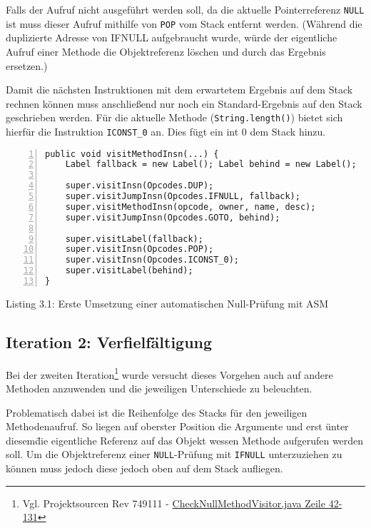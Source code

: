 Falls der Aufruf nicht ausgeführt werden soll, da die aktuelle Pointerreferenz \texttt{NULL}
ist muss dieser Aufruf mithilfe von \texttt{POP} vom Stack entfernt werden.
(Während die duplizierte Adresse von IFNULL aufgebraucht wurde, würde der
eigentliche Aufruf einer Methode die Objektreferenz löschen und durch das Ergebnis
ersetzen.)

Damit die nächsten Instruktionen mit dem erwartetem Ergebnis auf dem Stack
rechnen können muss anschließend nur noch ein Standard-Ergebnis
auf den Stack geschrieben werden. Für die aktuelle Methode (\texttt{String.length()})
bietet sich hierfür die Instruktion \texttt{ICONST\_0} an. Dies fügt ein int 0 dem Stack hinzu.

\begin{lstlisting}[basicstyle=\ttfamily,numbers=left,numberstyle=\footnotesize\ttfamily,backgroundcolor=\color{source}]
public void visitMethodInsn(...) {
	Label fallback = new Label(); Label behind = new Label();

	super.visitInsn(Opcodes.DUP);
	super.visitJumpInsn(Opcodes.IFNULL, fallback);
	super.visitMethodInsn(opcode, owner, name, desc);
	super.visitJumpInsn(Opcodes.GOTO, behind);

	super.visitLabel(fallback);
	super.visitInsn(Opcodes.POP);
	super.visitInsn(Opcodes.ICONST_0);
	super.visitLabel(behind);
}
\end{lstlisting}
\centerline{Listing 3.1: Erste Umsetzung einer automatischen Null-Prüfung mit ASM}

\vspace{0.3cm}


\subsection{Iteration 2: Verfielfältigung}

Bei der zweiten Iteration\footnote{Vgl. Projektsourcen Rev 749111 - \href{https://github.com/jerolimov/java-hardener/blob/749111f5dcc3f71a1d1db5a669591288245e912b/src/main/java/de/fhkoeln/gm/cui/javahardener/CheckNullMethodVisitor.java\#L42-131}{CheckNullMethodVisitor.java Zeile 42-131}}
wurde versucht dieses Vorgehen auch auf andere Methoden anzuwenden und die
jeweiligen Unterschiede zu beleuchten.

Problematisch dabei ist die Reihenfolge des Stacks für den jeweiligen Methodenaufruf.
So liegen auf oberster Position die Argumente und erst \"unter diesem\" die eigentliche
Referenz auf das Objekt wessen Methode aufgerufen werden soll. Um die Objektreferenz
einer \texttt{NULL}-Prüfung mit \texttt{IFNULL} unterzuziehen zu können muss
jedoch diese jedoch oben auf dem Stack aufliegen.

